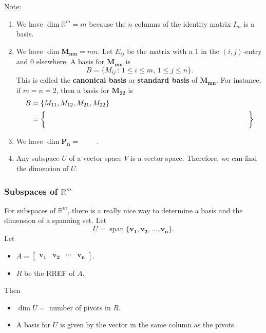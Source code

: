 \documentclass[20pt,a4paper]{extarticle}
\DeclareMathOperator{\Span}{span}
\begin{document}
\underline{Note:}
	\begin{enumerate}[label=\Circled{\arabic*}]
		\item We have $\dim \mathbb{R}^m = m$ because the $n$ columns of the identity matrix $I_m$ is a basis.
		\item We have $\dim \mathbf{M_{mn}} = mn$. Let $E_{ij}$ be the matrix with a $1$ in the $(i,j)$-entry and $0$ elsewhere. A basis for $\mathbf{M_{mn}}$ is
			\[
				B = \{ M_{ij} \, : \, 1 \leq i \leq m , \, 1 \leq j \leq n \} .
			\]
		This is called the \textbf{canonical basis} or \textbf{standard basis} of $\mathbf{M_{mn}}$. For instance, if $m = n = 2$, then a basis for $\mathbf{M_{22}}$ is
			\begin{align*}
				B &= \{ M_{11} , M_{12} , M_{21} , M_{22} \} \\ 
				&= \left\{ \phantom{\begin{bmatrix} 1 & 0 \\ 0 & 0 \end{bmatrix} , \begin{bmatrix} 0 & 1 \\ 0 & 0 \end{bmatrix} , \begin{bmatrix} 0 & 0 \\ 1 & 0 \end{bmatrix} , \begin{bmatrix} 0 & 0 \\ 0 & 1 \end{bmatrix}} \hspace*{5cm} \right\}
			\end{align*}
		\item We have $\dim \mathbf{P_n} = \phantom{n + 1}$.
		\vfill 
		\item Any subspace $U$ of a vector space $V$ is a vector space. Therefore, we can find the dimension of $U$.
	\end{enumerate}


\newpage 

\subsubsection{Subspaces of $\mathbb{R}^m$}

For subspaces of $\mathbb{R}^m$, there is a really nice way to determine a basis and the dimension of a spanning set. Let
	\[
		U = \Span \{ \mathbf{v_1} , \mathbf{v_2} , \ldots , \mathbf{v_n} \} .
	\]
Let 
	\begin{itemize}
		\item $A = \begin{bmatrix} \mathbf{v_1} & \mathbf{v_2} & \cdots & \mathbf{v_n} \end{bmatrix}$. 
		\item $R$ be the RREF of $A$.
	\end{itemize}
Then
	\begin{itemize}
		\item $\dim U = $ number of pivots in $R$.
		\item A basis for $U$ is given by the vector in the same column as the pivots.
	\end{itemize}
\end{document}
